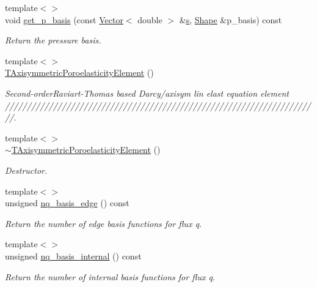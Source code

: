 \begin{DoxyCompactItemize}
{\footnotesize template$<$$>$ }\\void \hyperlink{classoomph_1_1TAxisymmetricPoroelasticityElement_ae2b824db26087cecbb5a20d14931354a}{get\+\_\+p\+\_\+basis} (const \hyperlink{classoomph_1_1Vector}{Vector}$<$ double $>$ \&\hyperlink{cfortran_8h_ab7123126e4885ef647dd9c6e3807a21c}{s}, \hyperlink{classoomph_1_1Shape}{Shape} \&p\+\_\+basis) const
\begin{DoxyCompactList}\small\item\em Return the pressure basis. \end{DoxyCompactList}\item 
{\footnotesize template$<$$>$ }\\\hyperlink{classoomph_1_1TAxisymmetricPoroelasticityElement_a8985c7d503781673e601806377bc4df7}{T\+Axisymmetric\+Poroelasticity\+Element} ()
\begin{DoxyCompactList}\small\item\em Second-\/order\+Raviart-\/\+Thomas based Darcy/axisym lin elast equation element ////////////////////////////////////////////////////////////////////////. \end{DoxyCompactList}\item 
{\footnotesize template$<$$>$ }\\\hyperlink{classoomph_1_1TAxisymmetricPoroelasticityElement_abae3970ff40308627b14c0c676698d63}{$\sim$\+T\+Axisymmetric\+Poroelasticity\+Element} ()
\begin{DoxyCompactList}\small\item\em Destructor. \end{DoxyCompactList}\item 
{\footnotesize template$<$$>$ }\\unsigned \hyperlink{classoomph_1_1TAxisymmetricPoroelasticityElement_ac8bf7a876d0d1411cdeda49d416b3369}{nq\+\_\+basis\+\_\+edge} () const
\begin{DoxyCompactList}\small\item\em Return the number of edge basis functions for flux q. \end{DoxyCompactList}\item 
{\footnotesize template$<$$>$ }\\unsigned \hyperlink{classoomph_1_1TAxisymmetricPoroelasticityElement_a712947a5033fb2b36f1aae345ff3b366}{nq\+\_\+basis\+\_\+internal} () const
\begin{DoxyCompactList}\small\item\em Return the number of internal basis functions for flux q. \end{DoxyCompactList}\item 

\end{DoxyCompactItemize}
